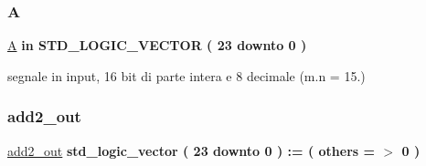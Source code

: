 \subsubsection{\texorpdfstring{A}{A}}
{\footnotesize\ttfamily \hyperlink{group___linear_regression_gae1ad6503d157f6c26abdce1131d31ec2}{A} {\bfseries \textcolor{vhdlchar}{in}\textcolor{vhdlchar}{ }} {\bfseries \textcolor{vhdlchar}{S\+T\+D\+\_\+\+L\+O\+G\+I\+C\+\_\+\+V\+E\+C\+T\+OR}\textcolor{vhdlchar}{ }\textcolor{vhdlchar}{(}\textcolor{vhdlchar}{ }\textcolor{vhdlchar}{ } \textcolor{vhdldigit}{23} \textcolor{vhdlchar}{ }\textcolor{vhdlchar}{downto}\textcolor{vhdlchar}{ }\textcolor{vhdlchar}{ } \textcolor{vhdldigit}{0} \textcolor{vhdlchar}{ }\textcolor{vhdlchar}{)}\textcolor{vhdlchar}{ }} \hspace{0.3cm}{\ttfamily [Port]}}



segnale in input, 16 bit di parte intera e 8 decimale (m.\+n = 15.) 

\mbox{\label{group___linear_regression_gabe0971183491c9fa959c5609d09b3714}} 
\subsubsection{\texorpdfstring{add2\+\_\+out}{add2\_out}}
{\footnotesize\ttfamily \hyperlink{group___linear_regression_gabe0971183491c9fa959c5609d09b3714}{add2\+\_\+out} {\bfseries \textcolor{vhdlchar}{std\+\_\+logic\+\_\+vector}\textcolor{vhdlchar}{ }\textcolor{vhdlchar}{(}\textcolor{vhdlchar}{ }\textcolor{vhdlchar}{ } \textcolor{vhdldigit}{23} \textcolor{vhdlchar}{ }\textcolor{vhdlchar}{downto}\textcolor{vhdlchar}{ }\textcolor{vhdlchar}{ } \textcolor{vhdldigit}{0} \textcolor{vhdlchar}{ }\textcolor{vhdlchar}{)}\textcolor{vhdlchar}{ }\textcolor{vhdlchar}{ }\textcolor{vhdlchar}{ }\textcolor{vhdlchar}{\+:}\textcolor{vhdlchar}{=}\textcolor{vhdlchar}{ }\textcolor{vhdlchar}{(}\textcolor{vhdlchar}{ }\textcolor{vhdlchar}{ }\textcolor{vhdlchar}{others}\textcolor{vhdlchar}{ }\textcolor{vhdlchar}{ }\textcolor{vhdlchar}{=}\textcolor{vhdlchar}{ }\textcolor{vhdlchar}{$>$}\textcolor{vhdlchar}{ }\textcolor{vhdlchar}{\textquotesingle{}}\textcolor{vhdlchar}{ } \textcolor{vhdldigit}{0} \textcolor{vhdlchar}{ }\textcolor{vhdlchar}{\textquotesingle{}}\textcolor{vhdlchar}{ }\textcolor{vhdlchar}{)}\textcolor{vhdlchar}{ }} \hspace{0.3cm}{\ttfamily [Signal]}}


